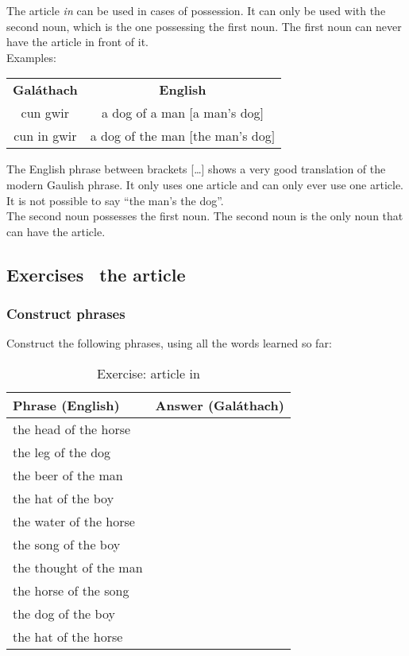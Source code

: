 The article \textit{in} can be used in cases of possession. It can only be used with the second noun, which is the one possessing the first noun. The first noun can never have the article in front of it.\\
Examples:
\begin{table}[H]
\centering
\begin{tabular}{cc}
  \toprule
  \textbf{Gal\'{a}thach} & \textbf{English}\\
  \cmidrule(lr){1-1}\cmidrule(lr){2-2}
  cun gwir & a dog of a man $[$a man's dog$]$\\
  cun in gwir & a dog of the man $[$the man's dog$]$\\
  \bottomrule
\end{tabular}
\label{examples_possession_first_noun_no_particle_in_front}
\end{table}

The English phrase between brackets [\dots] shows a very good translation of the modern Gaulish phrase. It only uses one article and can only ever use one article. It is not possible to say ``the man's the dog''.\\

The second noun possesses the first noun. The second noun is the only noun that can have the article.

\newpage
\subsection{Exercises \textendash\ the article}

\subsubsection{Construct phrases}

Construct the following phrases, using all the words learned so far:
\begin{table}[H]
\centering
\begin{tabular}{|l|M{10.0cm}|}
  \toprule
  \textbf{Phrase (English)} & \textbf{Answer (Gal\'{a}thach)}\\
  \toprule
  the head of the horse & \\
  \midrule
  the leg of the dog & \\
  \midrule
  the beer of the man & \\
  \midrule
  the hat of the boy & \\
  \midrule
  the water of the horse & \\
  \midrule
  the song of the boy & \\
  \midrule
  the thought of the man & \\
  \midrule
  the horse of the song & \\
  \midrule
  the dog of the boy & \\
  \midrule
  the hat of the horse & \\
  \bottomrule
\end{tabular}
\label{exercise_article_in}
\caption{Exercise: article in}
\end{table}

